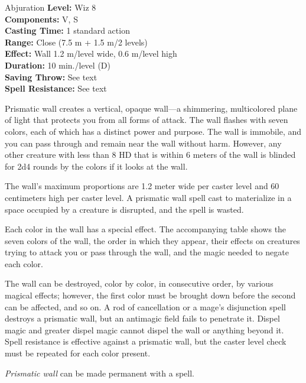 {Abjuration}
{
	\textbf{Level:}
	Wiz 8\\
	\textbf{Components:}
	V, S\\
	\textbf{Casting Time:}
	1 standard action\\
	\textbf{Range:}
	Close (7.5 m + 1.5 m/2 levels)\\
	\textbf{Effect:}
	Wall 1.2 m/level wide, 0.6 m/level high\\
	\textbf{Duration:}
	10 min./level (D)\\
	\textbf{Saving Throw:}
	See text\\
	\textbf{Spell Resistance:}
	See text\\
}
{
	Prismatic wall creates a vertical, opaque wall---a shimmering, multicolored plane of light that protects you from all forms of attack. The wall flashes with seven colors, each of which has a distinct power and purpose. The wall is immobile, and you can pass through and remain near the wall without harm. However, any other creature with less than 8 HD that is within 6 meters of the wall is blinded for 2d4 rounds by the colors if it looks at the wall.

	The wall's maximum proportions are 1.2 meter wide per caster level and 60 centimeters high per caster level. A prismatic wall spell cast to materialize in a space occupied by a creature is disrupted, and the spell is wasted.

	Each color in the wall has a special effect. The accompanying table shows the seven colors of the wall, the order in which they appear, their effects on creatures trying to attack you or pass through the wall, and the magic needed to negate each color.

	The wall can be destroyed, color by color, in consecutive order, by various magical effects; however, the first color must be brought down before the second can be affected, and so on. A rod of cancellation or a mage's disjunction spell destroys a prismatic wall, but an antimagic field fails to penetrate it. Dispel magic and greater dispel magic cannot dispel the wall or anything beyond it. Spell resistance is effective against a prismatic wall, but the caster level check must be repeated for each color present.

	\emph{Prismatic wall} can be made permanent with a  spell.
}
